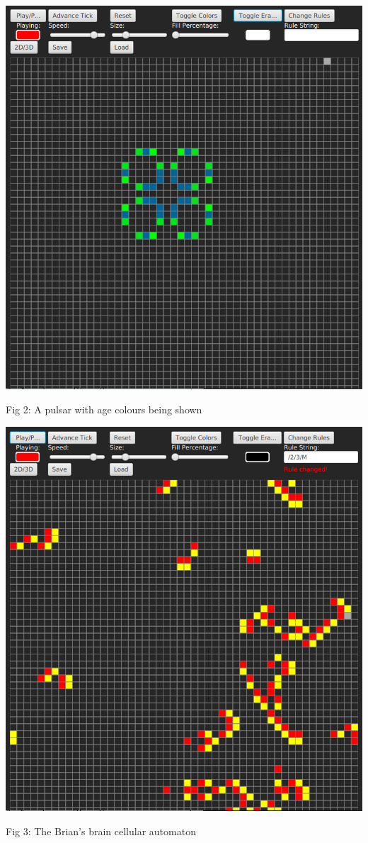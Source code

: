 \documentclass[11pt]{article}
\begin{document}
\begin{center}
\includegraphics[width=.9\linewidth]{./Fig2.png}
\end{center}
Fig 2:  A pulsar with age colours being shown

\begin{center}
\includegraphics[width=.9\linewidth]{./Fig3.png}
\end{center}
Fig 3: The Brian's brain cellular automaton
\end{document}

